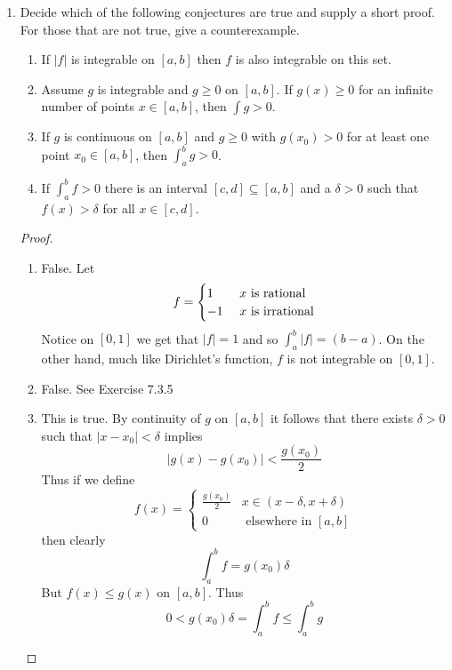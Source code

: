 \begin{enumerate}
    \item Decide which of the following conjectures are true and supply a short proof. For those that are not true, give a counterexample.
    \begin{enumerate}
        \item If \( \vert f \vert \) is integrable on \( [a,b] \) then \( f \) is also integrable on this set.
        \item Assume \( g \) is integrable and \( g \geq 0 \) on \( [a,b] \). If \( g(x) \geq 0 \) for an infinite number of points \( x \in [a,b] \), then \( \int g > 0 \).
        \item If \( g \) is continuous on \( [a,b] \) and \( g \geq 0 \) with \( g(x_0) > 0 \) for at least one point \( x_0 \in [a,b] \), then \( \int_a^b g > 0 \).
        \item If \( \int_a^b f > 0 \) there is an interval \( [c,d] \subseteq [a,b] \) and a \( \delta > 0 \) such that \( f(x) > \delta \) for all \( x \in [c,d] \). 
    \end{enumerate}
    
    \begin{proof}
    \begin{enumerate}
        \item False. Let 
        \[
        f = \begin{cases} 1 & \text{ \( x \) is rational} \\ -1 & \text{ \( x \) is irrational} \end{cases}
        \]
        Notice on \( [0,1] \) we get that \( \vert f \vert = 1 \) and so \( \int_a^b \vert f \vert = (b-a) \). On the other hand, much like Dirichlet's function, \( f \) is not integrable on \( [0,1] \). 
        
        \item False. See Exercise 7.3.5
        
        \item This is true. By continuity of \( g \) on \( [a,b] \) it follows that there exists \( \delta > 0 \) such that \( \left| x - x_0 \right| < \delta \) implies
        \[
        \left| g(x) - g(x_0) \right| < \frac{g(x_0)}{2}
        \]
        Thus if we define
        \[
        f(x) = \begin{cases} \frac{g(x_0)}{2} & x \in (x-\delta, x+\delta) \\ 0 & \text{ elsewhere in } [a,b]\end{cases}
        \]
        then clearly
        \[
        \int_a^b f = g(x_0)\delta
        \]
        But \( f(x) \leq g(x) \) on \( [a,b] \). Thus
        \[
        0 < g(x_0)\delta = \int_a^b f \leq \int_a^b g
        \]
        

\end{enumerate}
\end{proof}
\end{enumerate}
